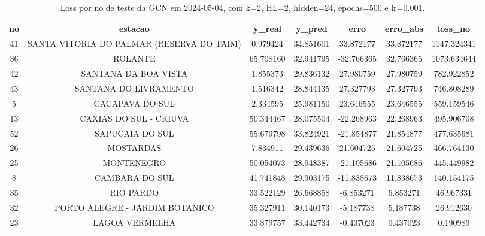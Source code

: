 \begin{table}[h]
\centering
\caption{Loss por no de teste da GCN em 2024-05-04, com k=2, HL=2, hidden=24, epochs=500 e lr=0.001.}
\label{tab:gcn_loss_k2_hl2_h24_e500_d20240504}
\begin{tabular}{ccccccc}
\toprule
no & estacao & y\_real & y\_pred & erro & erro\_abs & loss\_no \\
\midrule
41 & SANTA VITORIA DO PALMAR (RESERVA DO TAIM) & 0.979424 & 34.851601 & 33.872177 & 33.872177 & 1147.324341 \\
36 & ROLANTE & 65.708160 & 32.941795 & -32.766365 & 32.766365 & 1073.634644 \\
42 & SANTANA DA BOA VISTA & 1.855373 & 29.836132 & 27.980759 & 27.980759 & 782.922852 \\
43 & SANTANA DO LIVRAMENTO & 1.516342 & 28.844135 & 27.327793 & 27.327793 & 746.808289 \\
5 & CACAPAVA DO SUL & 2.334595 & 25.981150 & 23.646555 & 23.646555 & 559.159546 \\
13 & CAXIAS DO SUL - CRIUVA & 50.344467 & 28.075504 & -22.268963 & 22.268963 & 495.906708 \\
52 & SAPUCAIA DO SUL & 55.679798 & 33.824921 & -21.854877 & 21.854877 & 477.635681 \\
26 & MOSTARDAS & 7.834911 & 29.439636 & 21.604725 & 21.604725 & 466.764130 \\
25 & MONTENEGRO & 50.054073 & 28.948387 & -21.105686 & 21.105686 & 445.449982 \\
8 & CAMBARA DO SUL & 41.741848 & 29.903175 & -11.838673 & 11.838673 & 140.154175 \\
35 & RIO PARDO & 33.522129 & 26.668858 & -6.853271 & 6.853271 & 46.967331 \\
32 & PORTO ALEGRE - JARDIM BOTANICO & 35.327911 & 30.140173 & -5.187738 & 5.187738 & 26.912630 \\
23 & LAGOA VERMELHA & 33.879757 & 33.442734 & -0.437023 & 0.437023 & 0.190989 \\
\bottomrule
\end{tabular}
\end{table}
